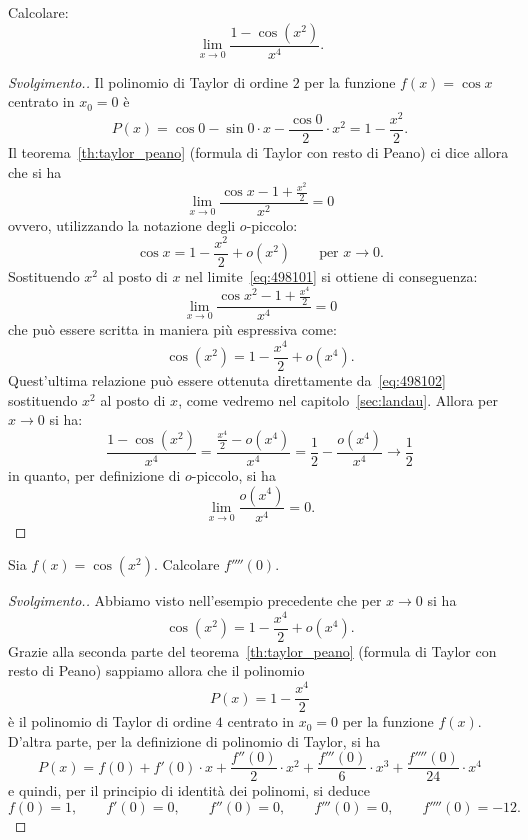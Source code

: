 \begin{exercise}
Calcolare:
\[
  \lim_{x\to 0} \frac{1-\cos(x^2)}{x^4}.
\]
\end{exercise}
\begin{proof}[Svolgimento.]
Il polinomio di Taylor di ordine $2$ per la funzione $f(x) = \cos x$ 
centrato in $x_0=0$ è 
\[ 
  P(x)
   = \cos 0 - \sin 0\cdot x -\frac{\cos 0}{2} \cdot x^2 
   = 1 - \frac{x^2}{2}.
\]
Il teorema~\ref{th:taylor_peano} (formula di Taylor con resto di Peano)
ci dice allora che si ha  
\begin{equation}\label{eq:498101}
   \lim_{x\to 0} \frac{\cos x - 1 + \frac {x^2}{2}}{x^2} = 0
\end{equation}
ovvero, utilizzando la notazione degli $o$-piccolo:
\begin{equation}\label{eq:498102}
  \cos x = 1 - \frac{x^2}{2} + o(x^2)
  \qquad \text{per $x\to 0.$}
\end{equation}
Sostituendo $x^2$ al posto di $x$ nel limite~\eqref{eq:498101} 
si ottiene di conseguenza:
\begin{equation}\label{eq:498103}
  \lim_{x\to 0}\frac{\cos x^2 -1 + \frac{x^4}{2}}{x^4} = 0
\end{equation}
che può essere scritta in maniera più espressiva come:
\[
  \cos (x^2) = 1 - \frac{x^4}{2} + o(x^4).
\]
Quest'ultima relazione può essere ottenuta direttamente 
da~\eqref{eq:498102} sostituendo $x^2$ al posto di $x$, 
come vedremo nel capitolo~\ref{sec:landau}.
Allora per $x\to 0$ si ha:
\[
  \frac{1-\cos(x^2)}{x^4} 
  = \frac{\frac{x^4}{2} - o(x^4)}{x^4} 
  = \frac 1 2 - \frac{o(x^4)}{x^4} \to \frac 1 2
\]
in quanto, per definizione di $o$-piccolo, si ha
\[
  \lim_{x\to 0 } \frac{o(x^4)}{x^4} = 0.
\]
\end{proof}

\begin{example}
Sia $f(x) = \cos(x^2)$. Calcolare $f''''(0)$.
\end{example}
\begin{proof}[Svolgimento.]
Abbiamo visto nell'esempio precedente che per $x\to 0$ si ha 
\[
  \cos(x^2) = 1 - \frac{x^4}{2} + o(x^4).
\]
Grazie alla seconda parte del teorema~\ref{th:taylor_peano} (formula di Taylor con resto di Peano)
sappiamo allora che il polinomio 
\[
  P(x) = 1 - \frac{x^4}{2}
\]
è il polinomio di Taylor di ordine $4$ centrato in $x_0=0$ per la funzione $f(x)$.
D'altra parte, per la definizione di polinomio di Taylor, si ha
\[
  P(x) = f(0) + f'(0) \cdot x + \frac{f''(0)}{2} \cdot x^2 
  + \frac{f'''(0)}{6} \cdot x^3 + \frac{f''''(0)}{24} \cdot x^4
\]
e quindi, per il principio di identità dei polinomi, si deduce
\[
  f(0) = 1,\qquad
  f'(0) = 0,\qquad
  f''(0) = 0,\qquad
  f'''(0) = 0,\qquad
  f''''(0) = -12.
\]
\end{proof}

